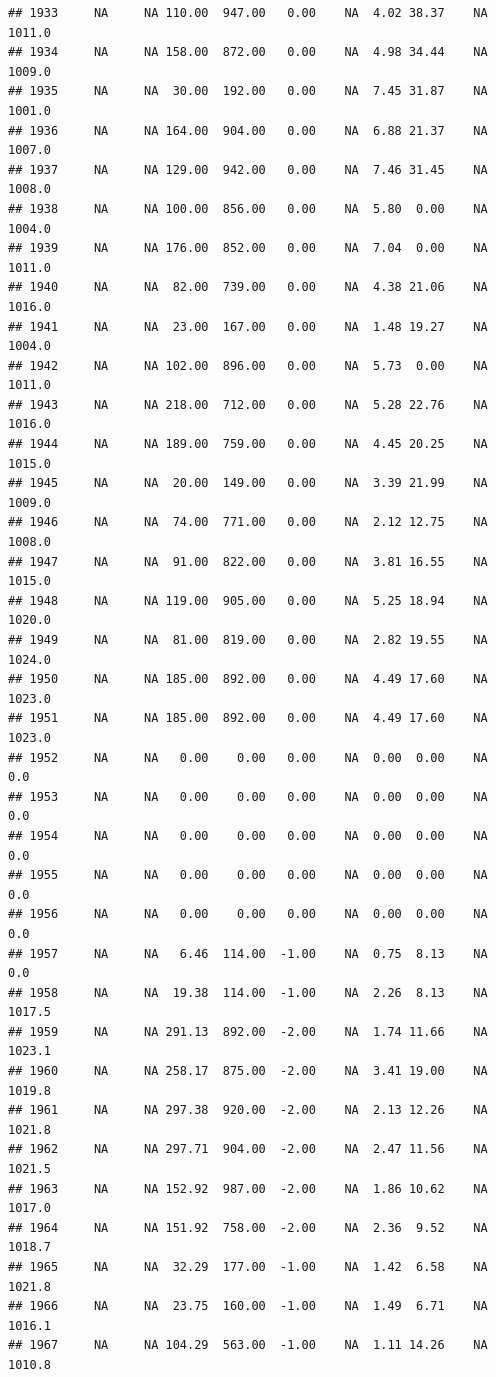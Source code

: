 \documentclass{article}\usepackage{graphicx, color}
\makeatletter
\newenvironment{kframe}{%
 \def\at@end@of@kframe{}%
 \ifinner\ifhmode%
  \def\at@end@of@kframe{\end{minipage}}%
  \begin{minipage}{\columnwidth}%
 \fi\fi%
 \def\FrameCommand##1{\hskip\@totalleftmargin \hskip-\fboxsep
 \colorbox{shadecolor}{##1}\hskip-\fboxsep
     \hskip-\linewidth \hskip-\@totalleftmargin \hskip\columnwidth}%
 \MakeFramed {\advance\hsize-\width
   \@totalleftmargin\z@ \linewidth\hsize
   \@setminipage}}%
 {\par\unskip\endMakeFramed%
 \at@end@of@kframe}
\newenvironment{knitrout}{}{} %
\makeatother
\begin{document}
\begin{knitrout}
\begin{kframe}
\begin{verbatim}
## 1933     NA     NA 110.00  947.00   0.00    NA  4.02 38.37    NA 1011.0
## 1934     NA     NA 158.00  872.00   0.00    NA  4.98 34.44    NA 1009.0
## 1935     NA     NA  30.00  192.00   0.00    NA  7.45 31.87    NA 1001.0
## 1936     NA     NA 164.00  904.00   0.00    NA  6.88 21.37    NA 1007.0
## 1937     NA     NA 129.00  942.00   0.00    NA  7.46 31.45    NA 1008.0
## 1938     NA     NA 100.00  856.00   0.00    NA  5.80  0.00    NA 1004.0
## 1939     NA     NA 176.00  852.00   0.00    NA  7.04  0.00    NA 1011.0
## 1940     NA     NA  82.00  739.00   0.00    NA  4.38 21.06    NA 1016.0
## 1941     NA     NA  23.00  167.00   0.00    NA  1.48 19.27    NA 1004.0
## 1942     NA     NA 102.00  896.00   0.00    NA  5.73  0.00    NA 1011.0
## 1943     NA     NA 218.00  712.00   0.00    NA  5.28 22.76    NA 1016.0
## 1944     NA     NA 189.00  759.00   0.00    NA  4.45 20.25    NA 1015.0
## 1945     NA     NA  20.00  149.00   0.00    NA  3.39 21.99    NA 1009.0
## 1946     NA     NA  74.00  771.00   0.00    NA  2.12 12.75    NA 1008.0
## 1947     NA     NA  91.00  822.00   0.00    NA  3.81 16.55    NA 1015.0
## 1948     NA     NA 119.00  905.00   0.00    NA  5.25 18.94    NA 1020.0
## 1949     NA     NA  81.00  819.00   0.00    NA  2.82 19.55    NA 1024.0
## 1950     NA     NA 185.00  892.00   0.00    NA  4.49 17.60    NA 1023.0
## 1951     NA     NA 185.00  892.00   0.00    NA  4.49 17.60    NA 1023.0
## 1952     NA     NA   0.00    0.00   0.00    NA  0.00  0.00    NA    0.0
## 1953     NA     NA   0.00    0.00   0.00    NA  0.00  0.00    NA    0.0
## 1954     NA     NA   0.00    0.00   0.00    NA  0.00  0.00    NA    0.0
## 1955     NA     NA   0.00    0.00   0.00    NA  0.00  0.00    NA    0.0
## 1956     NA     NA   0.00    0.00   0.00    NA  0.00  0.00    NA    0.0
## 1957     NA     NA   6.46  114.00  -1.00    NA  0.75  8.13    NA    0.0
## 1958     NA     NA  19.38  114.00  -1.00    NA  2.26  8.13    NA 1017.5
## 1959     NA     NA 291.13  892.00  -2.00    NA  1.74 11.66    NA 1023.1
## 1960     NA     NA 258.17  875.00  -2.00    NA  3.41 19.00    NA 1019.8
## 1961     NA     NA 297.38  920.00  -2.00    NA  2.13 12.26    NA 1021.8
## 1962     NA     NA 297.71  904.00  -2.00    NA  2.47 11.56    NA 1021.5
## 1963     NA     NA 152.92  987.00  -2.00    NA  1.86 10.62    NA 1017.0
## 1964     NA     NA 151.92  758.00  -2.00    NA  2.36  9.52    NA 1018.7
## 1965     NA     NA  32.29  177.00  -1.00    NA  1.42  6.58    NA 1021.8
## 1966     NA     NA  23.75  160.00  -1.00    NA  1.49  6.71    NA 1016.1
## 1967     NA     NA 104.29  563.00  -1.00    NA  1.11 14.26    NA 1010.8

\end{verbatim}
\end{kframe}
\end{knitrout}
\end{document}
